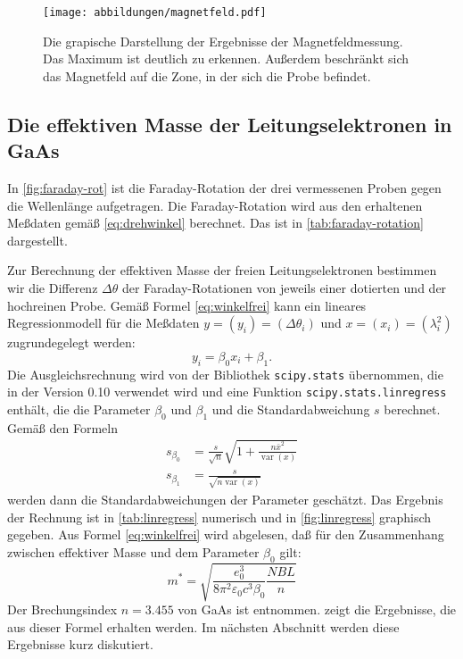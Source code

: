 \begin{figure}
  \centering
  \texttt{[image: abbildungen/magnetfeld.pdf]}
  \caption{Die grapische Darstellung der Ergebnisse der
    Magnetfeldmessung.  Das Maximum ist deutlich zu erkennen.  Außerdem
    beschränkt sich das Magnetfeld auf die Zone, in der sich die Probe
    befindet.}
  \label{fig:magnetfeld}
\end{figure}
\FloatBarrier
\subsection{Die effektiven Masse der Leitungselektronen in GaAs}

In \cref{fig:faraday-rot} ist die Faraday-Rotation der drei vermessenen
Proben gegen die Wellenlänge aufgetragen.  Die Faraday-Rotation wird aus
den erhaltenen Meßdaten gemäß \cref{eq:drehwinkel} berechnet. Das ist in
\cref{tab:faraday-rotation} dargestellt.

Zur Berechnung der effektiven Masse der freien Leitungselektronen
bestimmen wir die Differenz $\Delta\theta$ der Faraday-Rotationen von
jeweils einer dotierten und der hochreinen Probe.  Gemäß Formel
\eqref{eq:winkelfrei} kann ein lineares Regressionmodell für die
Meßdaten $y = (y_i) = (\Delta\theta_i)$ und $x = (x_i) = (\lambda_i^2)$
zugrundegelegt werden:
%
\begin{equation}
  \label{eq:linregress}
  y_i = \beta_0 x_i + \beta_1.
\end{equation}
Die Ausgleichsrechnung wird von der Bibliothek \texttt{scipy.stats}
übernommen, die in der Version 0.10 verwendet wird und eine Funktion
\texttt{scipy.stats.linregress} enthält, die die Parameter $\beta_0$ und
$\beta_1$ und die Standardabweichung $s$ berechnet.  Gemäß den Formeln
%
\begin{align}
  \label{eq:stat-formeln}
  s_{\beta_0} &= \frac{s}{\sqrt{n}} \sqrt{1 + \frac{n\bar{x}^2}
    {\operatorname{var}(x)}}\\
  s_{\beta_1} &= \frac{s}{\sqrt{n \operatorname{var}(x)}}
\end{align}
%
werden dann die Standardabweichungen der Parameter geschätzt.  Das
Ergebnis der Rechnung ist in \cref{tab:linregress} numerisch und in
\cref{fig:linregress} graphisch gegeben.  Aus Formel
\eqref{eq:winkelfrei} wird abgelesen, daß für den Zusammenhang zwischen
effektiver Masse und dem Parameter $\beta_0$ gilt:
%
\begin{equation}
m^{*} = \sqrt{\frac{e_0^3}{8\pi^2\varepsilon_0c^3\beta_0} \frac{NBL}{n}}
\label{eq:effekt}
\end{equation}
%
Der Brechungsindex $n = \num{3.455}$ von GaAs ist \cite{filmetrics}
entnommen.  zeigt die Ergebnisse, die aus dieser
Formel erhalten werden.  Im nächsten Abschnitt werden diese Ergebnisse
kurz diskutiert.

